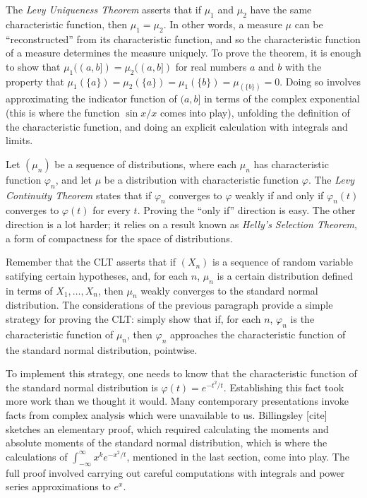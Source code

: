 \documentclass{article}
\newcommand{\ph}{\varphi}
\begin{document}
The \emph{Levy Uniqueness Theorem} asserts that if $\mu_1$ and $\mu_2$ have the same characteristic function, then $\mu_1 = \mu_2$. In other words, a measure $\mu$ can be ``reconstructed'' from its characteristic function, and so the characteristic function of a measure determines the measure uniquely. To prove the theorem, it is enough to show that $\mu_1((a,b]) = \mu_2((a,b])$ for real numbers $a$ and $b$ with the property that $\mu_1(\{a\}) = \mu_2(\{a\}) = \mu_1(\{b\}) = \mu_(\{b\}) = 0$. Doing so involves approximating the indicator function of $(a,b]$ in terms of the complex exponential (this is where the function $\sin x / x$ comes into play), unfolding the definition of the characteristic function, and doing an explicit calculation with integrals and limits.

Let $(\mu_n)$ be a sequence of distributions, where each $\mu_n$ has characteristic function $\ph_n$, and let $\mu$ be a distribution with characteristic function $\ph$. The \emph{Levy Continuity Theorem} states that if $\ph_n$ converges to $\ph$ weakly if and only if $\ph_n(t)$ converges to $\ph(t)$ for every $t$. Proving the ``only if'' direction is easy. The other direction is a lot harder; it relies on a result known as \emph{Helly's Selection Theorem}, a form of compactness for the space of distributions.

Remember that the CLT asserts that if $(X_n)$ is a sequence of random variable satifying certain hypotheses, and, for each $n$, $\mu_n$ is a certain distribution defined in terms of $X_1, \ldots, X_n$, then $\mu_n$ weakly converges to the standard normal distribution. The considerations of the previous paragraph provide a simple strategy for proving the CLT: simply show that if, for each $n$, $\ph_n$ is the characteristic function of $\mu_n$, then $\ph_n$ approaches the characteristic function of the standard normal distribution, pointwise.

To implement this strategy, one needs to know that the characteristic function of the standard normal distribution is $\ph(t) = e^{-t^2/t}$. Establishing this fact took more work than we thought it would. Many contemporary presentations invoke facts from complex analysis which were unavailable to us. Billingsley [cite] sketches an elementary proof, which required calculating the moments and absolute moments of the standard normal distribution, which is where the calculations of $\int_{-\infty}^\infty x^k e^{-x^2 / t}$, mentioned in the last section, come into play. The full proof involved carrying out careful computations with integrals and power series approximations to $e^x$.
\end{document}
